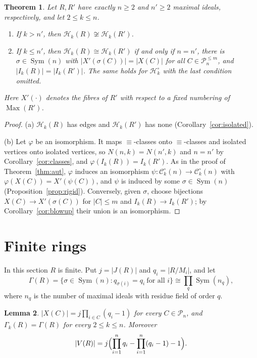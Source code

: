 \documentclass{amsart}
\newtheorem{theorem}{Theorem}[section]
\newtheorem{lemma}[theorem]{Lemma}
\theoremstyle{definition}
\theoremstyle{remark}
\newcommand{\Max}{\operatorname{Max}}
\newcommand{\Sym}{\operatorname{Sym}}
\newcommand{\cC}{\mathcal{C}}
\newcommand{\cP}{\mathcal{P}}
\newcommand{\cH}{\mathcal{H}}
\begin{document}
\begin{theorem}\label{thm:iso}
Let $R,R'$ have exactly $n\ge2$ and $n'\ge2$ maximal ideals, respectively, and let $2\le k\le n$.
\begin{enumerate}
\item[(a)] If $k>n'$, then $\cH_k(R)\not\cong\cH_k(R')$.
\item[(b)] If $k\le n'$, then $\cH_k(R)\cong\cH_k(R')$ if and only if $n=n'$, there is $\sigma\in\Sym(n)$ with $|X'(\sigma(C))|=|X(C)|$ for all $C\in\cP_n^{\le m}$, and $|I_k(R)|=|I_k(R')|$. The same holds for $\cH_k^\circ$ with the last condition omitted.
\end{enumerate}
Here $X'(\cdot)$ denotes the fibres of $R'$ with respect to a fixed numbering of $\Max(R')$.
\end{theorem}

\begin{proof}
(a) $\cH_k(R)$ has edges and $\cH_k(R')$ has none (Corollary~\ref{cor:isolated}).

(b) Let $\varphi$ be an isomorphism. It maps $\equiv$-classes onto $\equiv$-classes and isolated vertices onto isolated vertices, so $N(n,k)=N(n',k)$ and $n=n'$ by Corollary~\ref{cor:classes}, and $\varphi(I_k(R))=I_k(R')$. As in the proof of Theorem~\ref{thm:aut}, $\varphi$ induces an isomorphism $\psi\colon\cC_k^\circ(n)\to\cC_k^\circ(n)$ with $\varphi(X(C))=X'(\psi(C))$, and $\psi$ is induced by some $\sigma\in\Sym(n)$ (Proposition~\ref{prop:rigid}). Conversely, given $\sigma$, choose bijections $X(C)\to X'(\sigma(C))$ for $|C|\le m$ and $I_k(R)\to I_k(R')$; by Corollary~\ref{cor:blowup} their union is an isomorphism.
\end{proof}

\section{Finite rings}\label{sec:finite}

In this section $R$ is finite. Put $j=|J(R)|$ and $q_i=|R/M_i|$, and let
\[
\Gamma(R)=\{\sigma\in\Sym(n): q_{\sigma(i)}=q_i\ \text{for all } i\}\cong\prod_q\Sym(n_q),
\]
where $n_q$ is the number of maximal ideals with residue field of order $q$.

\begin{lemma}\label{lem:finite}
$|X(C)|=j\prod_{i\in C}(q_i-1)$ for every $C\in\cP_n$, and $\Gamma_k(R)=\Gamma(R)$ for every $2\le k\le n$. Moreover
\[
|V(R)|=j\Bigl(\prod_{i=1}^n q_i-\prod_{i=1}^n(q_i-1)-1\Bigr).
\]
\end{lemma}
\end{document}
